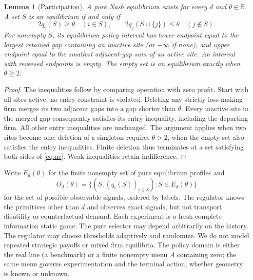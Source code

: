 \documentclass[11pt]{article}
\newtheorem{lemma}{Lemma}
\begin{document}
\begin{lemma}[Participation]\label{lem:participation}
A pure Nash equilibrium exists for every $d$ and $\theta\in\mathbb R$. A set $S$ is an equilibrium if and only if
\begin{equation}\label{eq:ne}
2q_i(S)\geq\theta\quad(i\in S),\qquad 2q_j(S\cup\{j\})\leq\theta\quad(j\notin S).
\end{equation}
For nonempty $S$, its equilibrium policy interval has lower endpoint equal to the largest retained gap containing an inactive site (or $-\infty$ if none), and upper endpoint equal to the smallest adjacent-gap sum of an active site. An interval with reversed endpoints is empty. The empty set is an equilibrium exactly when $\theta\geq2$.
\end{lemma}
\begin{proof}
The inequalities follow by comparing operation with zero profit. Start with all sites active; no entry constraint is violated. Deleting any strictly loss-making firm merges its two adjacent gaps into a gap shorter than $\theta$. Every inactive site in the merged gap consequently satisfies its entry inequality, including the departing firm. All other entry inequalities are unchanged. The argument applies when two sites become one; deletion of a singleton requires $\theta>2$, when the empty set also satisfies the entry inequalities. Finite deletion thus terminates at a set satisfying both sides of \eqref{eq:ne}. Weak inequalities retain indifference.
\end{proof}

Write $E_d(\theta)$ for the finite nonempty set of pure equilibrium profiles and
\[
O_d(\theta)=\{(S,(q_i(S))_{i\in S}):S\in E_d(\theta)\}
\]
for the set of possible observable signals, ordered by labels. The regulator knows the primitives other than $d$ and observes exact signals, but not transport disutility or counterfactual demand. Each experiment is a fresh complete-information static game. The pure selector may depend arbitrarily on the history. The regulator may choose thresholds adaptively and randomize. We do not model repeated strategic payoffs or mixed firm equilibria. The policy domain is either the real line (a benchmark) or a finite nonempty menu $A$ containing zero; the same menu governs experimentation and the terminal action, whether geometry is known or unknown.
\end{document}
